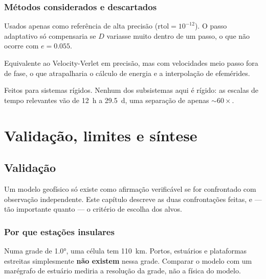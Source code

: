 \documentclass[11pt,a4paper,oneside]{report}
\theoremstyle{definition}
\theoremstyle{plain}
\theoremstyle{remark}
\begin{document}
\section{Métodos considerados e descartados}

\begin{description}[style=nextline,leftmargin=0.8cm]
\item[Runge--Kutta encaixados adaptativos (RKF45, DOPRI5, DOP853)] Usados apenas como referência de alta precisão
  ($\text{rtol}=10^{-12}$). O
  passo adaptativo só compensaria se $D$ variasse muito dentro de um passo, o
  que não ocorre com $e=\num{0.055}$.
\item[Leapfrog puro] Equivalente ao Velocity-Verlet em precisão, mas com
  velocidades meio passo fora de fase, o que atrapalharia o cálculo de energia e
  a interpolação de efemérides.
\item[Métodos implícitos (Radau, BDF)] Feitos para sistemas rígidos. Nenhum dos
  subsistemas aqui é rígido: as escalas de tempo relevantes vão de \SI{12}{\hour}
  a \SI{29.5}{\day}, uma separação de apenas $\sim\!60\times$.
\end{description}

\part{Validação, limites e síntese}
\label{parte:sintese}

\chapter{Validação}
\label{cap:validacao}

Um modelo geofísico só existe como afirmação verificável se for confrontado com
observação independente. Este capítulo descreve as duas confrontações feitas, e
— tão importante quanto — o critério de escolha dos alvos.

\section{Por que estações insulares}
\label{sec:porqueilhas}

Numa grade de \ang{1.0}, uma célula tem \SI{110}{\kilo\meter}. Portos,
estuários e plataformas estreitas simplesmente \textbf{não existem} nessa
grade. Comparar o modelo com um marégrafo de estuário mediria a resolução da
grade, não a física do modelo.
\end{document}
